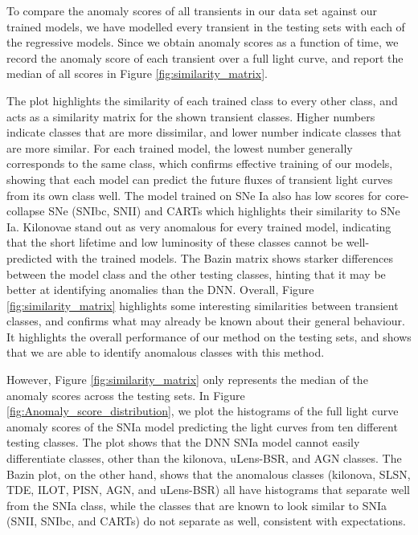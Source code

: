 \documentclass[fleqn,usenatbib]{mnras}
\begin{document}
To compare the anomaly scores of all transients in our data set against our trained models, we have modelled every transient in the testing sets with each of the regressive models. Since we obtain anomaly scores as a function of time, we record the anomaly score of each transient over a full light curve, and report the median of all scores in Figure \ref{fig:similarity_matrix}. 

The plot highlights the similarity of each trained class to every other class, and acts as a similarity matrix for the shown transient classes. Higher numbers indicate classes that are more dissimilar, and lower number indicate classes that are more similar. For each trained model, the lowest number generally corresponds to the same class, which confirms effective training of our models, showing that each model can predict the future fluxes of transient light curves from its own class well.  The model trained on SNe Ia also has low scores for core-collapse SNe (SNIbc, SNII) and CARTs which highlights their similarity to SNe Ia. Kilonovae stand out as very anomalous for every trained model, indicating that the short lifetime and low luminosity of these classes cannot be well-predicted with the trained models. The Bazin matrix shows starker differences between the model class and the other testing classes, hinting that it may be better at identifying anomalies than the DNN. Overall, Figure \ref{fig:similarity_matrix} highlights some interesting similarities between transient classes, and confirms what may already be known about their general behaviour. It highlights the overall performance of our method on the testing sets, and shows that we are able to identify anomalous classes with this method.

However, Figure \ref{fig:similarity_matrix} only represents the median of the anomaly scores across the testing sets. In Figure \ref{fig:Anomaly_score_distribution}, we plot the histograms of the full light curve anomaly scores of the SNIa model predicting the light curves from ten different testing classes. The plot shows that the DNN SNIa model cannot easily differentiate classes, other than the kilonova, uLens-BSR, and AGN classes. The Bazin plot, on the other hand, shows that the anomalous classes (kilonova, SLSN, TDE, ILOT, PISN, AGN, and uLens-BSR) all have histograms that separate well from the SNIa class, while the classes that are known to look similar to SNIa (SNII, SNIbc, and CARTs) do not separate as well, consistent with expectations.
\end{document}
